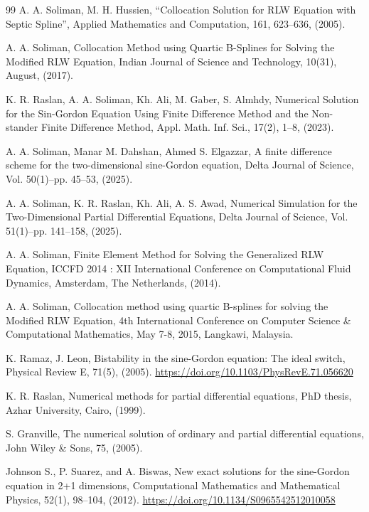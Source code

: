 \documentclass[10pt,letterpaper,twoside]{article}
\begin{document}
\begin{thebibliography}{99}
 A. A. Soliman, M. H. Hussien, ``Collocation Solution for RLW Equation with Septic Spline'', Applied Mathematics and Computation, 161, 623--636, (2005).

 A. A. Soliman, Collocation Method using Quartic B-Splines for Solving the Modified RLW Equation, Indian Journal of Science and Technology, 10(31), August, (2017).

 K. R. Raslan, A. A. Soliman, Kh. Ali, M. Gaber, S. Almhdy, Numerical Solution for the Sin-Gordon Equation Using Finite Difference Method and the Non-stander Finite Difference Method, Appl. Math. Inf. Sci., 17(2), 1--8, (2023).

 A. A. Soliman, Manar M. Dahshan, Ahmed S. Elgazzar, A finite difference scheme for the two-dimensional sine-Gordon equation, Delta Journal of Science, Vol. 50(1)--pp. 45--53, (2025).

 A. A. Soliman, K. R. Raslan, Kh. Ali, A. S. Awad, Numerical Simulation for the Two-Dimensional Partial Differential Equations, Delta Journal of Science, Vol. 51(1)--pp. 141--158, (2025).

 A. A. Soliman, Finite Element Method for Solving the Generalized RLW Equation, ICCFD 2014 : XII International Conference on Computational Fluid Dynamics, Amsterdam, The Netherlands, (2014).

 A. A. Soliman, Collocation method using quartic B-splines for solving the Modified RLW Equation, 4th International Conference on Computer Science \& Computational Mathematics, May 7-8, 2015, Langkawi, Malaysia.

 K. Ramaz, J. Leon, Bistability in the sine-Gordon equation: The ideal switch, Physical Review E, 71(5), (2005). \href{https://doi.org/10.1103/PhysRevE.71.056620}{https://doi.org/10.1103/PhysRevE.71.056620}

 K. R. Raslan, Numerical methods for partial differential equations, PhD thesis, Azhar University, Cairo, (1999).

 S. Granville, The numerical solution of ordinary and partial differential equations, John Wiley \& Sons, 75, (2005).

 Johnson S., P. Suarez, and A. Biswas, New exact solutions for the sine-Gordon equation in 2+1 dimensions, Computational Mathematics and Mathematical Physics, 52(1), 98--104, (2012). \href{https://doi.org/10.1134/S0965542512010058}{https://doi.org/10.1134/S0965542512010058}


\end{thebibliography}
\end{document}
